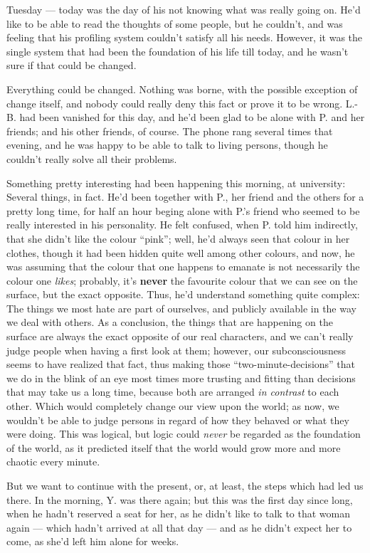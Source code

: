Tuesday --- today was the day of his not knowing what was really going on. He'd like to be able to read the thoughts of some people, but he couldn't, and was feeling that his profiling system couldn't satisfy all his needs. However, it was the single system that had been the foundation of his life till today, and he wasn't sure if that could be changed.

Everything could be changed. Nothing was borne, with the possible exception of change itself, and nobody could really deny this fact or prove it to be wrong. L.-B. had been vanished for this day, and he'd been glad to be alone with P. and her friends; and his other friends, of course. The phone rang several times that evening, and he was happy to be able to talk to living persons, though he couldn't really solve all their problems.

Something pretty interesting had been happening this morning, at university: Several things, in fact. He'd been together with P., her friend and the others for a pretty long time, for half an hour beging alone with P.'s friend who seemed to be really interested in his personality. He felt confused, when P. told him indirectly, that she didn't like the colour \enquote{pink}; well, he'd always seen that colour in her clothes, though it had been hidden quite well among other colours, and now, he was assuming that the colour that one happens to emanate is not necessarily the colour one \emph{likes}; probably, it's \textbf{never} the favourite colour that we can see on the surface, but the exact opposite. Thus, he'd understand something quite complex: The things we most hate are part of ourselves, and publicly available in the way we deal with others. As a conclusion, the things that are happening on the surface are always the exact opposite of our real characters, and we can't really judge people when having a first look at them; however, our subconsciousness seems to have realized that fact, thus making those \enquote{two-minute-decisions} that we do in the blink of an eye most times more trusting and fitting than decisions that may take us a long time, because both are arranged \emph{in contrast} to each other. Which would completely change our view upon the world; as now, we wouldn't be able to judge persons in regard of how they behaved or what they were doing. This was logical, but logic could \emph{never} be regarded as the foundation of the world, as it predicted itself that the world would grow more and more chaotic every minute.

But we want to continue with the present, or, at least, the steps which had led us there. In the morning, Y. was there again; but this was the first day since long, when he hadn't reserved a seat for her, as he didn't like to talk to that woman again --- which hadn't arrived at all that day --- and as he didn't expect her to come, as she'd left him alone for weeks.

